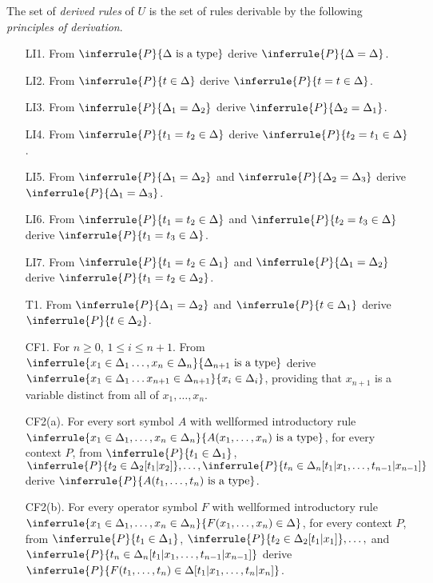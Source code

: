 \begin{definition}[2(b)]
The set of \emph{derived rules} of $U$ is the set of rules derivable by the following \emph{principles of derivation}.
\begin{enumerate}
\item[LI1.] From $\inferrule{P}{\Delta\isatype}$ derive $\inferrule{P}{\Delta=\Delta}$.
\item[LI2.] From $\inferrule{P}{t\in\Delta}$ derive $\inferrule{P}{t=t\in\Delta}$.
\item[LI3.] From $\inferrule{P}{\Delta_1=\Delta_2}$ derive $\inferrule{P}{\Delta_2=\Delta_1}$.
\item[LI4.] From $\inferrule{P}{t_1=t_2\in\Delta}$ derive $\inferrule{P}{t_2=t_1\in\Delta}$.
\item[LI5.] From $\inferrule{P}{\Delta_1=\Delta_2}$ and $\inferrule{P}{\Delta_2=\Delta_3}$ derive $\inferrule{P}{\Delta_1=\Delta_3}$.
\item[LI6.] From $\inferrule{P}{t_1=t_2\in\Delta}$ and $\inferrule{P}{t_2=t_3\in\Delta}$ derive $\inferrule{P}{t_1=t_3\in\Delta}$.
\item[LI7.] From $\inferrule{P}{t_1=t_2\in\Delta_1}$ and $\inferrule{P}{\Delta_1=\Delta_2}$ derive $\inferrule{P}{t_1=t_2\in\Delta_2}$.
\item[T1.] From $\inferrule{P}{\Delta_1=\Delta_2}$ and $\inferrule{P}{t\in\Delta_1}$ derive $\inferrule{P}{t\in\Delta_2}$.
\item[CF1.] For $n\geq 0$, $1\leq i\leq n+1$.
  From $\inferrule{x_1\in\Delta_1\ldots,x_n\in\Delta_n}{\Delta_{n+1}\isatype}$ derive $\inferrule{x_1\in\Delta_1\ldots x_{n+1}\in\Delta_{n+1}}{x_i\in\Delta_i}$, providing that $x_{n+1}$ is a variable distinct from all of $x_1,\ldots,x_n$.
\item[CF2(a).] For every sort symbol $A$ with wellformed introductory rule $\inferrule{x_1\in\Delta_1,\ldots,x_n\in\Delta_n}{A(x_1,\ldots,x_n)\isatype}$, for every context $P$, from $\inferrule{P}{t_1\in\Delta_1}$,$\inferrule{P}{t_2\in\Delta_2[t_1|x_2]},\ldots,\inferrule{P}{t_n\in\Delta_n[t_1|x_1,\ldots,t_{n-1}|x_{n-1}]}$ derive $\inferrule{P}{A(t_1,\ldots,t_n)\isatype}$.
\item [CF2(b).] For every operator symbol $F$ with wellformed introductory rule $\inferrule{x_1\in\Delta_1,\ldots,x_n\in\Delta_n}{F(x_1,\ldots,x_n)\in\Delta}$, for every context $P$, from $\inferrule{P}{t_1\in\Delta_1}$, $\inferrule{P}{t_2\in\Delta_2[t_1|x_1]},\ldots,$ and $\inferrule{P}{t_n\in\Delta_n[t_1|x_1,\ldots,t_{n-1}|x_{n-1}]}$ derive $\inferrule{P}{F(t_1,\ldots,t_n)\in\Delta[t_1|x_1,\ldots,t_n|x_n]}$.

\end{enumerate}
\end{definition}
